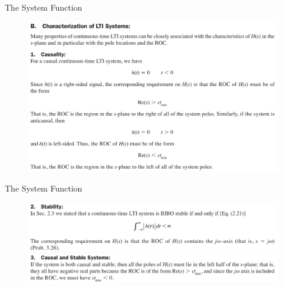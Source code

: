 \documentclass[pdflatex,compress,mathserif]{beamer}
\begin{document}
\begin{frame}{The System Function}
	\begin{figure}
		\centering
		\includegraphics[width=\linewidth]{img/img35}
	\end{figure}
\end{frame}

\begin{frame}{The System Function}
	\begin{figure}
		\centering
		\includegraphics[width=\linewidth]{img/img36}
		\includegraphics[width=\linewidth]{img/img37}
	\end{figure}
\end{frame}
\end{document}
